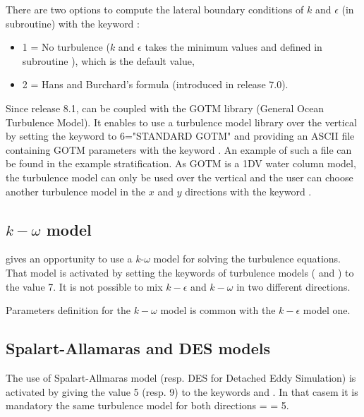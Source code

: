 There are two options to compute the lateral boundary conditions of $k$ and
$\epsilon$ (in  subroutine) with the keyword
:
\begin{itemize}
\item 1 = No turbulence ($k$ and $\epsilon$ takes the minimum values
 and  defined in subroutine ),
which is the default value,
\item 2 = Hans and Burchard’s formula (introduced in release 7.0).
\end{itemize}

Since release 8.1,  can be coupled with the GOTM library
(General Ocean Turbulence Model).
It enables to use a turbulence model library over the vertical by setting
the keyword  to 6="STANDARD GOTM"
and providing an ASCII file containing GOTM parameters with the keyword
.
An example of such a file can be found in the  example
stratification.
As GOTM is a 1DV water column model, the turbulence model can only be used over
the vertical and the user can choose another turbulence model in the $x$ and
$y$ directions with the keyword .

\subsection{$k-\omega$ model}

 gives an opportunity to use a $k$-$\omega$ model for solving
the turbulence equations.
That model is activated by setting the keywords of turbulence models
( and )
to the value 7.
It is not possible to mix $k-\epsilon$ and $k-\omega$ in two different
directions.

Parameters definition for the $k-\omega$ model is common
with the $k-\epsilon$ model one.

\subsection{Spalart-Allamaras and DES models}

The use of Spalart-Allmaras  model (resp. DES for Detached Eddy Simulation)
is activated by giving the value 5 (resp. 9) to the keywords
 and .
In that casem it is mandatory the same turbulence model for both directions
 =  = 5.

